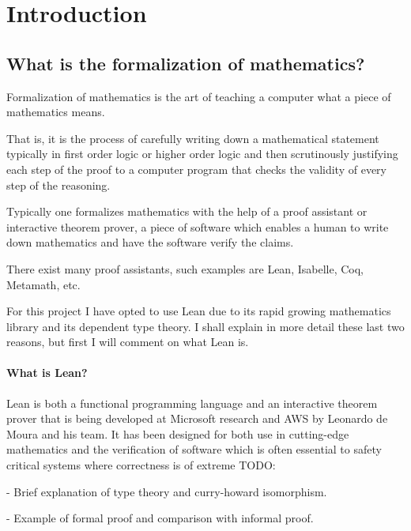 \chapter{Introduction}\label{Ch2_Introduction}

\section{What is the formalization of mathematics?}

Formalization of mathematics is the art of teaching a computer what a piece of mathematics means.

That is, it is the process of carefully writing down a mathematical statement typically in first order logic or higher order logic and then scrutinously justifying each step of the proof to a computer program that checks the validity of every step of the reasoning. 

Typically one formalizes mathematics with the help of a proof assistant or interactive theorem prover, a piece of software which enables a human to write down mathematics and have the software verify the claims.

There exist many proof assistants, such examples are Lean, Isabelle, Coq, Metamath, etc.

For this project I have opted to use Lean due to its rapid growing mathematics library and its dependent type theory. I shall explain in more detail these last two reasons, but first I will comment on what Lean is.

\subsubsection{What is Lean?}

Lean is both a functional programming language and an interactive theorem prover that is being developed at Microsoft research and AWS by Leonardo de Moura and his team. It has been designed for both use in cutting-edge mathematics and the verification of software which is often essential to safety critical systems where correctness is of extreme
TODO:

- Brief explanation of type theory and curry-howard isomorphism.

- Example of formal proof and comparison with informal proof.




